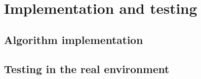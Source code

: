 \chapter{Implementation and testing}
\label{cha:implandtest}


\section{Algorithm implementation}
\label{sec:implementatnion}



\section{Testing in the real environment}
\label{sec:testing}

